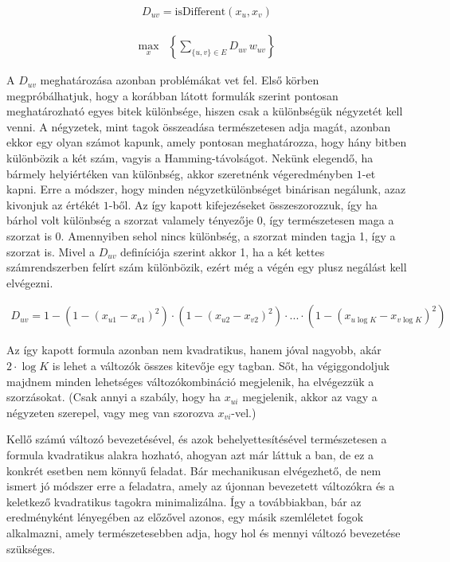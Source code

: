 \begin{align}
D_{uv} = \text{isDifferent}(x_u,x_v)
\end{align}

\begin{align} 
	\max_{x} & \left\{\sum _{\{u,v\} \in E } D_{uv} \, w_{uv} \right\} 
\end{align}

A $D_{uv}$ meghatározása azonban problémákat vet fel. Első körben megpróbálhatjuk, hogy a korábban látott formulák szerint pontosan meghatározható egyes bitek különbsége, hiszen csak a különbségük négyzetét kell venni. A négyzetek, mint tagok összeadása természetesen adja magát, azonban ekkor egy olyan számot kapunk, amely pontosan meghatározza, hogy hány bitben különbözik a két szám, vagyis a Hamming-távolságot. Nekünk elegendő, ha bármely helyiértéken van különbség, akkor szeretnénk végeredményben $1$-et kapni. Erre a módszer, hogy minden négyzetkülönbséget binárisan negálunk, azaz kivonjuk az értékét $1$-ből. Az így kapott kifejezéseket összeszorozzuk, így ha bárhol volt különbség a szorzat valamely tényezője 0, így természetesen maga a szorzat is 0. Amennyiben sehol nincs különbség, a szorzat minden tagja 1, így a szorzat is. Mivel a $D_{uv}$ definíciója szerint akkor 1, ha a két kettes számrendszerben felírt szám különbözik, ezért még a végén egy plusz negálást kell elvégezni.

\begin{align}	
	D_{uv} = 1-  \left( 1-(x_{u1}-x_{v1})^2 \right) \cdot \left( 1-(x_{u2}-x_{v2})^2 \right) \cdot ...  \cdot \left( 1-(x_{u\log K}-x_{v \log K})^2 \right) 
\end{align}

Az így kapott formula azonban nem kvadratikus, hanem jóval nagyobb, akár $2 \cdot \log K$ is lehet a változók összes kitevője egy tagban. Sőt, ha végiggondoljuk majdnem minden lehetséges változókombináció megjelenik, ha elvégezzük a szorzásokat. (Csak annyi a szabály, hogy ha $x_{ui}$ megjelenik, akkor az vagy a négyzeten szerepel, vagy meg van szorozva $x_{vi}$-vel.)

Kellő számú változó bevezetésével, és azok behelyettesítésével természetesen a formula kvadratikus alakra hozható, ahogyan azt már láttuk a ban, de ez a konkrét esetben nem könnyű feladat. Bár mechanikusan elvégezhető, de nem ismert jó módszer erre a feladatra, amely az újonnan bevezetett változókra és a keletkező kvadratikus tagokra minimalizálna. Így a továbbiakban, bár az eredményként lényegében az előzővel azonos, egy másik szemléletet fogok alkalmazni, amely természetesebben adja, hogy hol és mennyi változó bevezetése szükséges.


